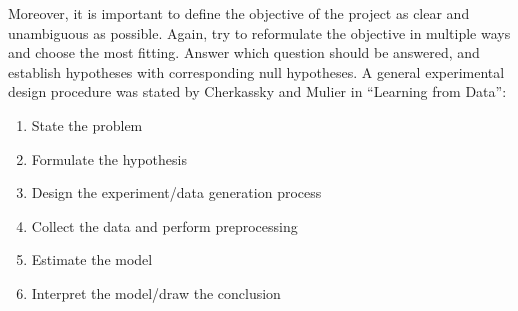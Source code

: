 Moreover, it is important to define the objective of the project as clear and unambiguous as possible. 
Again, try to reformulate the objective in multiple ways and choose the most fitting. 
Answer which question should be answered, and establish hypotheses with corresponding null hypotheses. 
A general experimental design procedure was stated by Cherkassky and Mulier in  ``Learning from Data''\cite{cherkassky1998learning}:
\begin{enumerate}
    \item {State the problem}
    \item {Formulate the hypothesis}
    \item {Design the experiment/data generation process}
    \item {Collect the data and perform preprocessing}
    \item {Estimate the model}
    \item {Interpret the model/draw the conclusion}
\end{enumerate}
